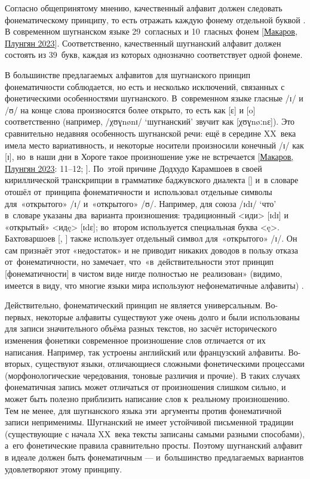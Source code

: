 Согласно общепринятому мнению, качественный алфавит должен следовать фонематическому принципу, то есть отражать каждую фонему отдельной буквой \parencite[141]{grenoble_whaley2005}. В современном шугнанском языке 29~согласных и 10~гласных фонем [\hyperref[chapter-makplun-morphon]{Макаров, Плунгян 2023}]. Соответственно, качественный шугнанский алфавит должен состоять из 39~букв, каждая из которых однозначно соответствует одной фонеме.

В большинстве предлагаемых алфавитов для шугнанского принцип фонематичности соблюдается, но есть и несколько исключений, связанных с фонетическими особенностями шугнанского. В~современном языке гласные /ɪ/ и /ʊ/ на конце слова произносятся более открыто, то есть как [ɛ] и [o] соответственно (например, /χʊɣnønɪ/ ‘шугнанский’ звучит как [χʊɣnøːnɛ]). Это сравнительно недавняя особенность шугнанской речи: ещё в середине XX~века имела место вариативность, и некоторые носители произносили конечный /ɪ/ как [ɪ], но~в наши дни в Хороге такое произношение уже не встречается [\hyperref[chapter-makplun-morphon]{Макаров, Плунгян 2023}: 11–12; \cite[61–62]{parker2023}]. По~этой причине Додхудо Карамшоев в своей кириллической транскрипции в грамматике баджувского диалекта [\cite*{karamshoev1963}] и~в словаре \parencite{karamshoev1988} отошёл от~принципа фонематичности и~использовал отдельные символы для~«открытого» /ɪ/ и~«открытого» /ʊ/. Например, для союза /ɪdɪ/ ‘что’ в~словаре указаны два~варианта произношения: традиционный <иди> [ɪdɪ] и «открытый» <идę> [ɪdɛ]; во~втором используется специальная буква <ę>. Бахтоваршоев [\cite*{bakhtovarshoev2013}, \cite*{bakhtovarshoev2016}] также использует отдельный символ для~«открытого» /ɪ/. Он сам признаёт этот «недостаток» и не приводит никаких доводов в пользу отказа от~фонематичности, но замечает, что~«в~действительности этот принцип [фонематичности] в чистом виде нигде полностью не~реализован» (видимо, имеется в виду, что многие языки мира используют нефонематичные алфавиты) \parencite[531]{bakhtovarshoev2013}.

Действительно, фонематический принцип не является универсальным. Во-первых, некоторые алфавиты существуют уже очень долго и были использованы для записи значительного объёма разных текстов, но засчёт исторического изменения фонетики современное произношение слов отличается от их написания. Например, так устроены английский или французский алфавиты. Во-вторых, существуют языки, отличающиеся сложными фонетическими процессами (морфонологические чередования, тоновые различия и прочие). В таких случаях фонематичная запись может отличаться от произношения слишком сильно, и может быть полезно приблизить написание слов к~реальному произношению. Тем не менее, для шугнанского языка эти~аргументы против фонематичной записи неприменимы. Шугнанский не имеет устойчивой письменной традиции (существующие с начала XX~века тексты записаны самыми разными способами), а~его фонетические правила сравнительно просты. Поэтому шугнанский алфавит в идеале должен быть фонематичным — и~большинство предлагаемых вариантов удовлетворяют этому принципу.

